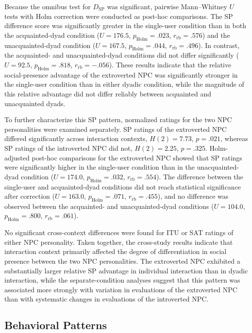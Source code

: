\documentclass[a4paper,fleqn]{cas-sc}
\begin{document}
Because the omnibus test for $D_{\mathrm{SP}}$ was significant, pairwise Mann--Whitney $U$ tests with Holm correction were conducted as post-hoc comparisons. The SP difference score was significantly greater in the single-user condition than in both the acquainted-dyad condition ($U=176.5$, $p_{\mathrm{Holm}}=.023$, $r_{\mathrm{rb}}=.576$) and the unacquainted-dyad condition ($U=167.5$, $p_{\mathrm{Holm}}=.044$, $r_{\mathrm{rb}}=.496$). In contrast, the acquainted- and unacquainted-dyad conditions did not differ significantly ($U=92.5$, $p_{\mathrm{Holm}}=.818$, $r_{\mathrm{rb}}=-.056$). These results indicate that the relative social-presence advantage of the extroverted NPC was significantly stronger in the single-user condition than in either dyadic condition, while the magnitude of this relative advantage did not differ reliably between acquainted and unacquainted dyads.

To further characterize this SP pattern, normalized ratings for the two NPC personalities were examined separately. SP ratings of the extroverted NPC differed significantly across interaction contexts, $H(2)=7.73$, $p=.021$, whereas SP ratings of the introverted NPC did not, $H(2)=2.25$, $p=.325$. Holm-adjusted post-hoc comparisons for the extroverted NPC showed that SP ratings were significantly higher in the single-user condition than in the unacquainted-dyad condition ($U=174.0$, $p_{\mathrm{Holm}}=.032$, $r_{\mathrm{rb}}=.554$). The difference between the single-user and acquainted-dyad conditions did not reach statistical significance after correction ($U=163.0$, $p_{\mathrm{Holm}}=.071$, $r_{\mathrm{rb}}=.455$), and no difference was observed between the acquainted- and unacquainted-dyad conditions ($U=104.0$, $p_{\mathrm{Holm}}=.800$, $r_{\mathrm{rb}}=.061$).

No significant cross-context differences were found for ITU or SAT ratings of either NPC personality. Taken together, the cross-study results indicate that interaction context primarily affected the degree of differentiation in social presence between the two NPC personalities. The extroverted NPC exhibited a substantially larger relative SP advantage in individual interaction than in dyadic interaction, while the separate-condition analyses suggest that this pattern was associated more strongly with variation in evaluations of the extroverted NPC than with systematic changes in evaluations of the introverted NPC.

\subsection{Behavioral Patterns}
\end{document}
